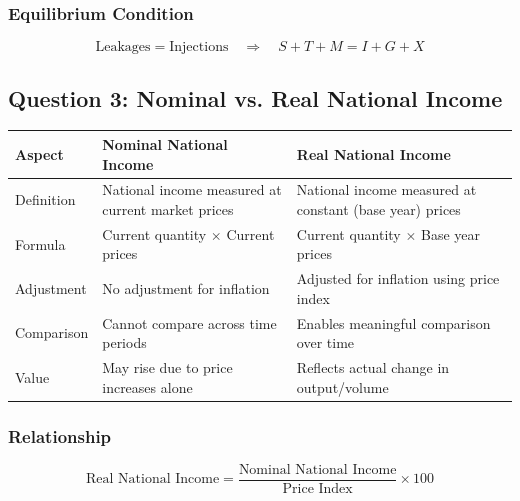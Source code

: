 \documentclass[12pt,a4paper]{article}
\begin{document}
\subsubsection*{Equilibrium Condition}
\begin{equation}
\text{Leakages} = \text{Injections} \quad \Rightarrow \quad S + T + M = I + G + X
\end{equation}


\subsection{Question 3: Nominal vs. Real National Income}

\begin{center}
\begin{tabular}{@{}p{4cm}p{5cm}p{5cm}@{}}
\toprule
\textbf{Aspect} & \textbf{Nominal National Income} & \textbf{Real National Income} \\
\midrule
Definition & National income measured at current market prices & National income measured at constant (base year) prices \\
\addlinespace
Formula & Current quantity $\times$ Current prices & Current quantity $\times$ Base year prices \\
\addlinespace
Adjustment & No adjustment for inflation & Adjusted for inflation using price index \\
\addlinespace
Comparison & Cannot compare across time periods & Enables meaningful comparison over time \\
\addlinespace
Value & May rise due to price increases alone & Reflects actual change in output/volume \\
\bottomrule
\end{tabular}
\end{center}

\subsubsection*{Relationship}
\begin{equation}
\text{Real National Income} = \frac{\text{Nominal National Income}}{\text{Price Index}} \times 100
\end{equation}
\end{document}

